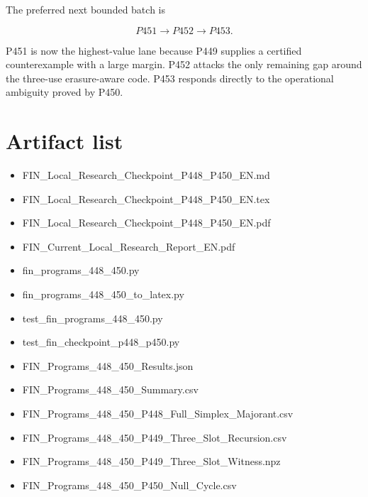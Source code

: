 \documentclass[11pt,a4paper,openany]{report}
\begin{document}
The preferred next bounded batch is

\[
\boxed{P451\longrightarrow P452\longrightarrow P453.}
\]

P451 is now the highest-value lane because P449 supplies a certified counterexample with a large margin. P452 attacks the only remaining gap around the three-use erasure-aware code. P453 responds directly to the operational ambiguity proved by P450.

\chapter{Artifact list}

\begin{itemize}
\item 
FIN\_Local\_Research\_Checkpoint\_P448\_P450\_EN.md

\item 
FIN\_Local\_Research\_Checkpoint\_P448\_P450\_EN.tex

\item 
FIN\_Local\_Research\_Checkpoint\_P448\_P450\_EN.pdf

\item 
FIN\_Current\_Local\_Research\_Report\_EN.pdf

\item 
fin\_programs\_448\_450.py

\item 
fin\_programs\_448\_450\_to\_latex.py

\item 
test\_fin\_programs\_448\_450.py

\item 
test\_fin\_checkpoint\_p448\_p450.py

\item 
FIN\_Programs\_448\_450\_Results.json

\item 
FIN\_Programs\_448\_450\_Summary.csv

\item 
FIN\_Programs\_448\_450\_P448\_Full\_Simplex\_Majorant.csv

\item 
FIN\_Programs\_448\_450\_P449\_Three\_Slot\_Recursion.csv

\item 
FIN\_Programs\_448\_450\_P449\_Three\_Slot\_Witness.npz

\item 
FIN\_Programs\_448\_450\_P450\_Null\_Cycle.csv


\end{itemize}
\end{document}

